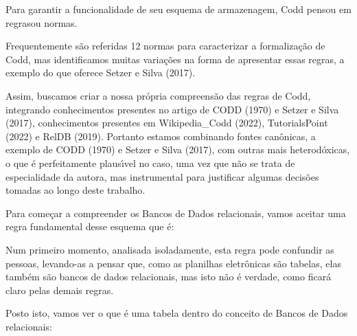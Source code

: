 \documentclass[
12pt,		%
openright,	%
twoside,  %
a4paper,			%
chapter=TITLE,		%
english,			%
french,				%
spanish,			%
brazil				%
]{USPSC-classe/USPSC}
\begin{document}
Para garantir a funcionalidade de seu esquema de armazenagem, Codd pensou em \textquotedbl regras\textquotedbl  ou normas.




Frequentemente s\~ao referidas 12 normas para caracterizar a formaliza\c{c}\~ao de Codd, mas identificamos muitas varia\c{c}\~oes na forma de apresentar essas regras, a exemplo do que oferece Setzer e Silva (2017).




Assim, buscamos criar a nossa pr\'opria compreens\~ao das regras de Codd, integrando conhecimentos presentes no artigo de  CODD (1970) e  Setzer e Silva (2017), conhecimentos presentes em Wikipedia\_Codd (2022),  TutorialsPoint (2022) e  RelDB (2019). Portanto estamos combinando fontes can\^onicas, a exemplo de  CODD (1970) e Setzer e Silva (2017), com outras mais heterod\'oxicas, o que \'e perfeitamente plaus\'{\i}vel no caso, uma vez que n\~ao se trata de especialidade da autora, mas instrumental para justificar algumas decis\~oes tomadas ao longo deste trabalho.




Para come\c{c}ar a compreender os Bancos de Dados relacionais, vamos aceitar uma regra fundamental desse esquema que \'e:





\noindent\begin{center}\mbox{\centering{}}\end{center}


Num primeiro momento, analisada isoladamente, esta regra pode confundir as pessoas, levando-as a pensar que, como as planilhas eletr\^onicas s\~ao tabelas, elas tamb\'em s\~ao bancos de dados relacionais, mas isto n\~ao \'e verdade, como ficar\'a claro pelas demais regras.




Posto isto, vamos ver o que \'e uma tabela dentro do conceito de Bancos de Dados relacionais:
\end{document}
